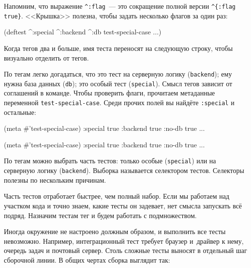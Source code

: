 Напомним, что выражение \verb|^:flag|~--- это сокращение полной версии
\verb|^{:flag true}|. <<Крышка>> полезна, чтобы задать несколько флагов за один
раз:

\begin{english}
  \begin{clojure}
(deftest ^:special ^:backend ^:db
  test-special-case
  ...)
  \end{clojure}
\end{english}

\noindent
Когда тегов два и больше, имя теста переносят на следующую строку, чтобы
визуально отделить от тегов.

По тегам легко догадаться, что это тест на серверную логику (\verb|backend|);
ему нужна база данных (\verb|db|); это особый тест (\verb|special|). Смысл
тегов зависит от соглашений в команде. Чтобы проверить флаги, прочитаем
метаданные переменной \verb|test-special-case|. Среди прочих полей вы найдёте
\verb|:special| и остальные:

\ifnarrow

\begin{english}
  \begin{clojure}
(meta #'test-special-case)
{:special true
 :backend true
 :no-db true ...}
  \end{clojure}
\end{english}

\else

\begin{english}
  \begin{clojure}
(meta #'test-special-case)
{:special true :backend true :no-db true ...}
  \end{clojure}
\end{english}

\fi

По тегам можно выбрать часть тестов: только особые (\verb|special|) или на
серверную логику (\verb|backend|). Выборка называется селектором
тестов. Селекторы полезны по нескольким причинам.

Часть тестов отработает быстрее, чем полный набор. Если мы работаем над участком
кода и точно знаем, какие тесты он задевает, нет смысла запускать всё
подряд. Назначим тестам тег и будем работать с подмножеством.

Иногда окружение не настроено должным образом, и выполнить все тесты
невозможно. Например, интеграционный тест требует браузер и~драйвер к нему,
очередь задач и почтовый сервер. Столь сложные тесты выносят в отдельный шаг
сборочной линии. В общих чертах сборка выглядит так:

